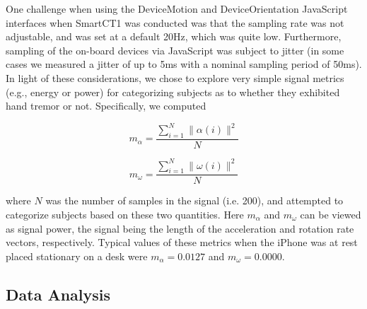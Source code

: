One challenge when using the DeviceMotion and DeviceOrientation JavaScript interfaces when \gls{SmartCT1} was conducted was that the sampling rate was not adjustable, and was set at a default 20Hz, which was quite low. Furthermore, sampling of the on-board devices via JavaScript was subject to jitter (in some cases we measured a jitter of up to 5ms with a nominal sampling period of 50ms). In light of these considerations, we chose to explore very simple signal metrics (e.g., energy or power) for categorizing subjects as to whether they exhibited hand tremor or not. Specifically, we computed

\begin{equation} \label{eq: magAlpha}
m_{\alpha} = \frac{\sum_{i=1}^{N} \|\alpha(i)\|^{2} }{N}
\end{equation}

\begin{equation} \label{eq: magOmega}
m_{\omega} = \frac{\sum_{i=1}^{N} \|\omega(i)\|^{2} }{N}
\end{equation}

\noindent 
where $N$ was the number of samples in the signal (i.e. 200), and attempted to categorize subjects based on these two quantities. Here $m_{\alpha}$ and $m_{\omega}$ can be viewed as signal power, the signal being the length of the acceleration and rotation rate vectors, respectively. Typical values of these metrics when the iPhone was at rest placed stationary on a desk were $m_{\alpha}=0.0127$ and  $m_{\omega}=0.0000$.

\subsection{Data Analysis}
\label{subsec:SmartCT1Analysis}
